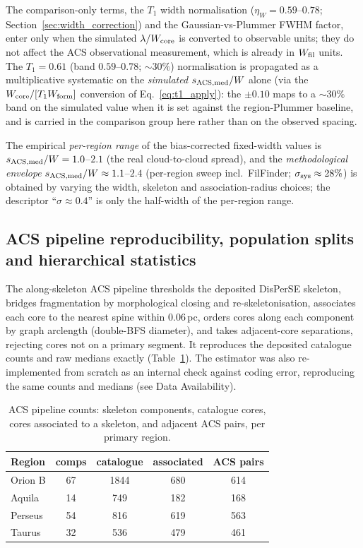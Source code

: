 \documentclass[usenatbib,twoside,twocolumn]{mnras}
\begin{document}
The comparison-only terms, the $T_1$ width normalisation ($\eta_W=0.59$--$0.78$; Section~\ref{sec:width_correction}) and the Gaussian-vs-Plummer FWHM factor, enter only when the simulated $\lambda/W_{\rm core}$ is converted to observable units; they do not affect the ACS observational measurement, which is already in $W_{\rm fil}$ units. The $T_1=0.61$ (band $0.59$--$0.78$; $\sim30\%$) normalisation is propagated as a multiplicative systematic on the \emph{simulated} $s_{\rm ACS,med}/W$ alone (via the $W_{\rm core}/[T_1 W_{\rm form}]$ conversion of Eq.~\ref{eq:t1_apply}): the $\pm0.10$ maps to a $\sim30\%$ band on the simulated value when it is set against the region-Plummer baseline, and is carried in the comparison group here rather than on the observed spacing.

The empirical \emph{per-region range} of the bias-corrected fixed-width values is $s_{\rm ACS,med}/W=1.0$--$2.1$ (the real cloud-to-cloud spread), and the \emph{methodological envelope} $s_{\rm ACS,med}/W\approx1.1$--$2.4$ (per-region sweep incl.\ FilFinder; $\sigma_{\rm sys}\approx28\%$) is obtained by varying the width, skeleton and association-radius choices; the descriptor ``$\sigma\approx0.4$'' is only the half-width of the per-region range.

\subsection{ACS pipeline reproducibility, population splits and hierarchical statistics}
\label{sec:nnpipeline}

The along-skeleton ACS pipeline thresholds the deposited DisPerSE skeleton, bridges fragmentation by morphological closing and re-skeletonisation, associates each core to the nearest spine within $0.06$\,pc, orders cores along each component by graph arclength (double-BFS diameter), and takes adjacent-core separations, rejecting cores not on a primary segment. It reproduces the deposited catalogue counts and raw medians exactly (Table~\ref{tab:nnpipeline}). The estimator was also re-implemented from scratch as an internal check against coding error, reproducing the same counts and medians (see Data Availability).

\begin{table}
\caption{ACS pipeline counts: skeleton components, catalogue cores, cores associated to a skeleton, and adjacent ACS pairs, per primary region.}
\label{tab:nnpipeline}
\footnotesize
\setlength{\tabcolsep}{4pt}
\begin{tabular}{lcccc}
\toprule
Region & comps & catalogue & associated & ACS pairs \\
\midrule
Orion B & 67 & 1844 & 680 & 614 \\
Aquila  & 14 & 749  & 182 & 168 \\
Perseus & 54 & 816  & 619 & 563 \\
Taurus  & 32 & 536  & 479 & 461 \\
\bottomrule
\end{tabular}
\end{table}
\end{document}
